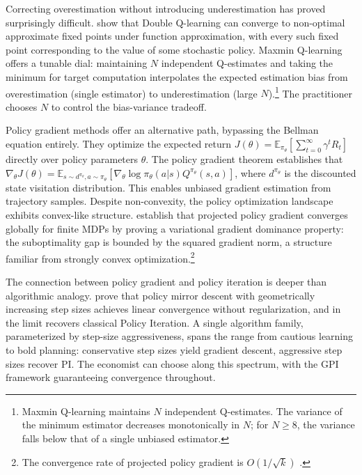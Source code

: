 Correcting overestimation without introducing underestimation has proved surprisingly difficult. \citet{ren2021underestimation} show that Double Q-learning can converge to non-optimal approximate fixed points under function approximation, with every such fixed point corresponding to the value of some stochastic policy. Maxmin Q-learning \citep{lan2020maxmin} offers a tunable dial: maintaining $N$ independent Q-estimates and taking the minimum for target computation interpolates the expected estimation bias from overestimation (single estimator) to underestimation (large $N$).\footnote{Maxmin Q-learning maintains $N$ independent Q-estimates. The variance of the minimum estimator decreases monotonically in $N$; for $N \geq 8$, the variance falls below that of a single unbiased estimator.} The practitioner chooses $N$ to control the bias-variance tradeoff.

Policy gradient methods offer an alternative path, bypassing the Bellman equation entirely. They optimize the expected return $J(\theta) = \mathbb{E}_{\pi_\theta}[\sum_{t=0}^\infty \gamma^t R_t]$ directly over policy parameters $\theta$. The policy gradient theorem \citep{SuttonMcAllester2000} establishes that $\nabla_\theta J(\theta) = \mathbb{E}_{s \sim d^{\pi_\theta}, a \sim \pi_\theta} [\nabla_\theta \log \pi_\theta(a|s) Q^{\pi_\theta}(s,a)]$, where $d^{\pi_\theta}$ is the discounted state visitation distribution. This enables unbiased gradient estimation from trajectory samples. Despite non-convexity, the policy optimization landscape exhibits convex-like structure. \citet{agarwal2021theory} establish that projected policy gradient converges globally for finite MDPs by proving a variational gradient dominance property: the suboptimality gap is bounded by the squared gradient norm, a structure familiar from strongly convex optimization.\footnote{The convergence rate of projected policy gradient is $O(1/\sqrt{k})$ \citep{agarwal2021theory}.}

The connection between policy gradient and policy iteration is deeper than algorithmic analogy. \citet{xiao2022convergence} prove that policy mirror descent with geometrically increasing step sizes achieves linear convergence without regularization, and in the limit recovers classical Policy Iteration. A single algorithm family, parameterized by step-size aggressiveness, spans the range from cautious learning to bold planning: conservative step sizes yield gradient descent, aggressive step sizes recover PI. The economist can choose along this spectrum, with the GPI framework guaranteeing convergence throughout.

